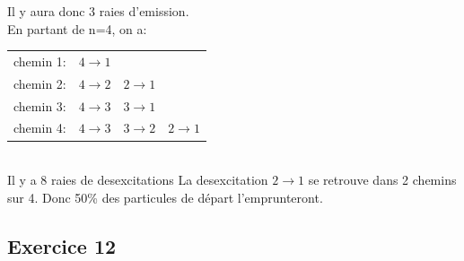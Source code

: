 \documentclass[12pt,french,dvips]{report}
\begin{document}
Il y aura donc 3 raies d'emission.\\
En partant de n=4, on a:\\
\begin{tabular}{llll}
chemin 1: & $4\rightarrow 1$ \\
chemin 2: & $4\rightarrow 2$ & $2\rightarrow 1$ \\
chemin 3: & $4\rightarrow 3$ & $3\rightarrow 1$ \\
chemin 4: & $4\rightarrow 3$ & $3\rightarrow 2$ & $2\rightarrow 1$ \\
\end{tabular}\\
Il y a 8 raies de desexcitations
La desexcitation $2\rightarrow 1$ se retrouve dans 2 chemins sur 4.
Donc 50\% des particules de départ l'emprunteront.
\subsection{Exercice 12}
\end{document}
